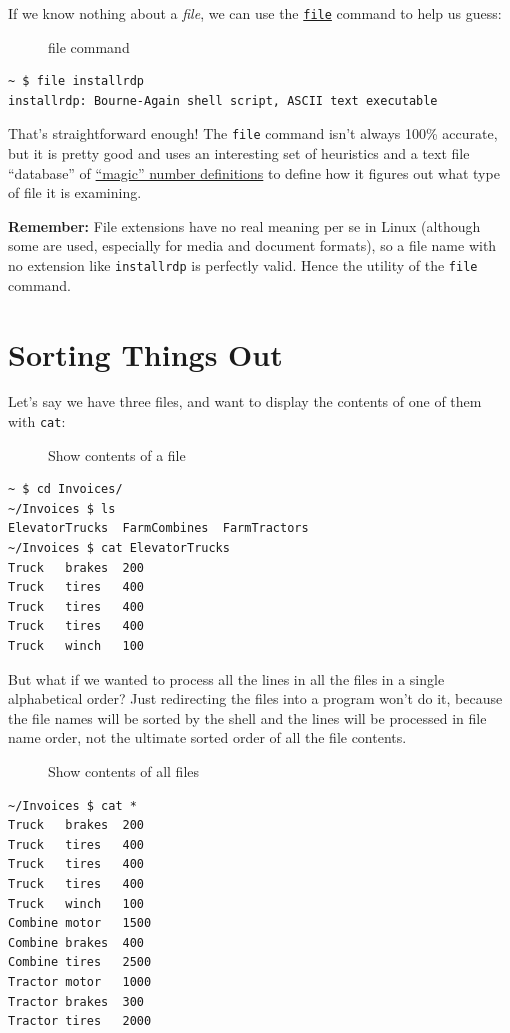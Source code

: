 \documentclass[10pt,]{book}
\numberwithin{figure}{chapter}
\DeclareRobustCommand{\drcap}[1]{\begin{figure}[H]\caption{#1}\end{figure}}
\DeclareRobustCommand{\drcmd}[1]{\index{Commands!#1}}
\begin{document}
If we know nothing about a \emph{file}, we can use the
\href{http://linux.die.net/man/1/file}{\texttt{file}}\drcmd{file}
command to help us guess:

\drcap{file command}

\begin{verbatim}
~ $ file installrdp 
installrdp: Bourne-Again shell script, ASCII text executable
\end{verbatim}

That's straightforward enough! The \texttt{file} command isn't always
100\% accurate, but it is pretty good and uses an interesting set of
heuristics and a text file ``database'' of
\href{http://linux.die.net/man/5/magic}{``magic'' number definitions} to
define how it figures out what type of file it is examining.

\textbf{Remember:} File extensions have no real meaning per se in Linux
(although some are used, especially for media and document formats), so
a file name with no extension like \texttt{installrdp} is perfectly
valid. Hence the utility of the \texttt{file} command.

\section{Sorting Things Out}\label{sorting-things-out}

Let's say we have three files, and want to display the contents of one
of them with \texttt{cat}:

\drcap{Show contents of a file}

\begin{verbatim}
~ $ cd Invoices/
~/Invoices $ ls
ElevatorTrucks  FarmCombines  FarmTractors
~/Invoices $ cat ElevatorTrucks 
Truck   brakes  200
Truck   tires   400
Truck   tires   400
Truck   tires   400
Truck   winch   100
\end{verbatim}

But what if we wanted to process all the lines in all the files in a
single alphabetical order? Just redirecting the files into a program
won't do it, because the file names will be sorted by the shell and the
lines will be processed in file name order, not the ultimate sorted
order of all the file contents.

\drcap{Show contents of all files}

\begin{verbatim}
~/Invoices $ cat *
Truck   brakes  200
Truck   tires   400
Truck   tires   400
Truck   tires   400
Truck   winch   100
Combine motor   1500
Combine brakes  400
Combine tires   2500
Tractor motor   1000
Tractor brakes  300
Tractor tires   2000
\end{verbatim}
\end{document}
